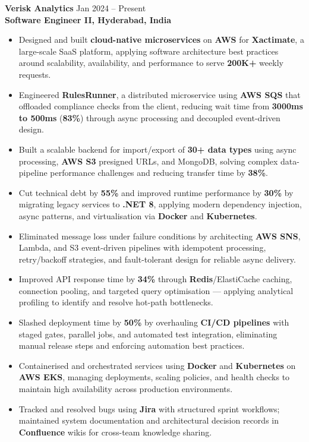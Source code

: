 \documentclass[letterpaper,10pt]{article}
\begin{document}
\textbf{Verisk Analytics} \hfill Jan 2024 -- Present \\
\textbf{Software Engineer II, Hyderabad, India}
\begin{itemize}[leftmargin=*]
    \item Designed and built \textbf{cloud-native microservices} on \textbf{AWS} for \textbf{Xactimate}, a large-scale SaaS platform, applying software architecture best practices around scalability, availability, and performance to serve \textbf{200K+} weekly requests.
    \item Engineered \textbf{RulesRunner}, a distributed microservice using \textbf{AWS SQS} that offloaded compliance checks from the client, reducing wait time from \textbf{3000ms to 500ms} (\textbf{83\%}) through async processing and decoupled event-driven design.
    \item Built a scalable backend for import/export of \textbf{30+ data types} using async processing, \textbf{AWS S3} presigned URLs, and MongoDB, solving complex data-pipeline performance challenges and reducing transfer time by \textbf{38\%}.
    \item Cut technical debt by \textbf{55\%} and improved runtime performance by \textbf{30\%} by migrating legacy services to \textbf{.NET 8}, applying modern dependency injection, async patterns, and virtualisation via \textbf{Docker} and \textbf{Kubernetes}.
    \item Eliminated message loss under failure conditions by architecting \textbf{AWS SNS}, Lambda, and S3 event-driven pipelines with idempotent processing, retry/backoff strategies, and fault-tolerant design for reliable async delivery.
    \item Improved API response time by \textbf{34\%} through \textbf{Redis}/ElastiCache caching, connection pooling, and targeted query optimisation — applying analytical profiling to identify and resolve hot-path bottlenecks.
    \item Slashed deployment time by \textbf{50\%} by overhauling \textbf{CI/CD pipelines} with staged gates, parallel jobs, and automated test integration, eliminating manual release steps and enforcing automation best practices.
    \item Containerised and orchestrated services using \textbf{Docker} and \textbf{Kubernetes} on \textbf{AWS EKS}, managing deployments, scaling policies, and health checks to maintain high availability across production environments.
    \item Tracked and resolved bugs using \textbf{Jira} with structured sprint workflows; maintained system documentation and architectural decision records in \textbf{Confluence} wikis for cross-team knowledge sharing.

\end{itemize}
\end{document}
